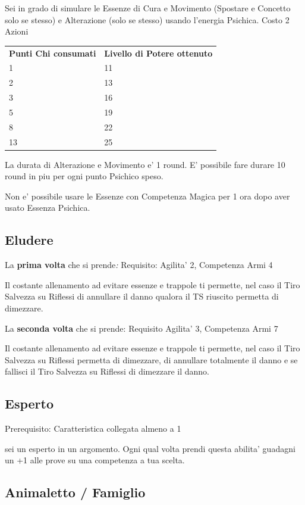 \documentclass[a4paper,11pt,twoside,openany]{book}
\begin{document}
	Sei in grado di simulare le Essenze di Cura e Movimento (Spostare e Concetto solo se stesso) e Alterazione (solo se stesso) usando l'energia Psichica. Costo 2 Azioni
	
	\bigskip
	
	\begin{tabular}{ll}
		\toprule
		\textbf{Punti Chi consumati} & \textbf{Livello di Potere ottenuto}\tabularnewline
		1 & 11\tabularnewline
		2 & 13\tabularnewline
		3 & 16\tabularnewline
		5 & 19\tabularnewline
		8 & 22\tabularnewline
		13 & 25\tabularnewline
		
	\end{tabular}
	
	\bigskip
	
	La durata di Alterazione e Movimento e' 1 round. E' possibile fare durare 10 round in piu per ogni punto Psichico speso.
	
	Non e' possibile usare le Essenze con Competenza Magica per 1 ora dopo aver usato Essenza Psichica.
	
	\subsection{Eludere}
	
	La \textbf{prima volta} che si prende\emph{:} Requisito: Agilita'
	2, Competenza Armi 4
	
	Il costante allenamento ad evitare essenze e trappole ti permette, nel caso il Tiro Salvezza su Riflessi di annullare il danno qualora il TS riuscito permetta di dimezzare.
	
	La \textbf{seconda volta} che si prende: Requisito Agilita' 3, Competenza
	Armi 7
	
	Il costante allenamento ad evitare essenze e trappole ti permette, nel caso il Tiro Salvezza su Riflessi permetta di dimezzare, di annullare totalmente il danno e se fallisci il Tiro Salvezza su Riflessi di dimezzare il danno.
	
	\subsection{Esperto}
	
	Prerequisito: Caratteristica collegata almeno a 1
	
	sei un esperto in un argomento. Ogni qual volta prendi questa abilita' guadagni un +1 alle prove su una competenza a tua scelta.
	
	\subsection{Animaletto / Famiglio}
	
\end{document}
